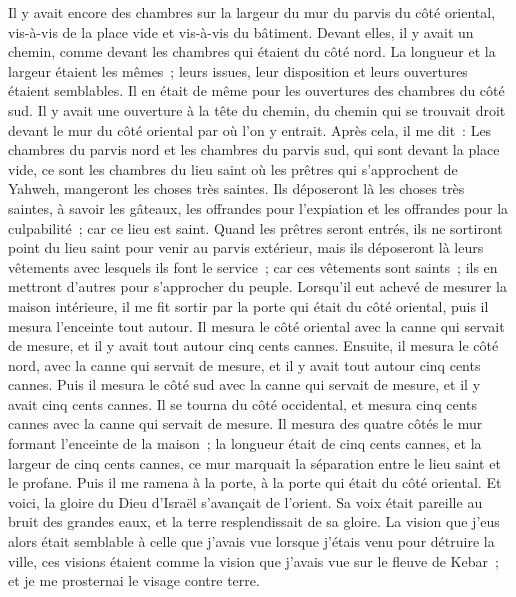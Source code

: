 \begin{multicols}{2}
Il y avait encore des chambres sur la largeur du mur du parvis du côté oriental, vis-à-vis de la place vide et vis-à-vis du bâtiment.
Devant elles, il y avait un chemin, comme devant les chambres qui étaient du côté nord. La longueur et la largeur étaient les mêmes~; leurs issues, leur disposition et leurs ouvertures étaient semblables.
Il en était de même pour les ouvertures des chambres du côté sud. Il y avait une ouverture à la tête du chemin, du chemin qui se trouvait droit devant le mur du côté oriental par où l'on y entrait.
Après cela, il me dit~: Les chambres du parvis nord et les chambres du parvis sud, qui sont devant la place vide, ce sont les chambres du lieu saint où les prêtres qui s'approchent de Yahweh, mangeront les choses très saintes. Ils déposeront là les choses très saintes, à savoir les gâteaux, les offrandes pour l'expiation et les offrandes pour la culpabilité~; car ce lieu est saint.
Quand les prêtres seront entrés, ils ne sortiront point du lieu saint pour venir au parvis extérieur, mais ils déposeront là leurs vêtements avec lesquels ils font le service~; car ces vêtements sont saints~; ils en mettront d'autres pour s'approcher du peuple.
Lorsqu'il eut achevé de mesurer la maison intérieure, il me fit sortir par la porte qui était du côté oriental, puis il mesura l'enceinte tout autour.
Il mesura le côté oriental avec la canne qui servait de mesure, et il y avait tout autour cinq cents cannes.
Ensuite, il mesura le côté nord, avec la canne qui servait de mesure, et il y avait tout autour cinq cents cannes.
Puis il mesura le côté sud avec la canne qui servait de mesure, et il y avait cinq cents cannes.
Il se tourna du côté occidental, et mesura cinq cents cannes avec la canne qui servait de mesure.
Il mesura des quatre côtés le mur formant l'enceinte de la maison~; la longueur était de cinq cents cannes, et la largeur de cinq cents cannes, ce mur marquait la séparation entre le lieu saint et le profane.
\VerseOne{}Puis il me ramena à la porte, à la porte qui était du côté oriental.
Et voici, la gloire du Dieu d'Israël s'avançait de l'orient. Sa voix était pareille au bruit des grandes eaux, et la terre resplendissait de sa gloire.
La vision que j'eus alors était semblable à celle que j'avais vue lorsque j'étais venu pour détruire la ville, ces visions étaient comme la vision que j'avais vue sur le fleuve de Kebar~; et je me prosternai le visage contre terre.

\end{multicols}
